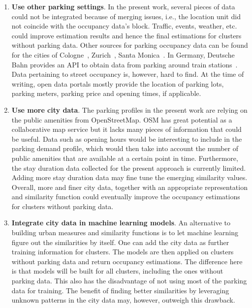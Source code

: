 \begin{enumerate}
	\item \textbf{Use other parking settings}.
In the present work, several pieces of data could not be integrated because of merging issues, i.e., the location unit did not coincide with the occupancy data's block.
Traffic, events, weather, etc. could improve estimation results and hence the final estimations for clusters without parking data.
Other sources for parking occupancy data can be found for the cities of Cologne~\cite{cologne_data}, Zurich~\cite{zurich_data}, Santa Monica~\cite{santa_monica_data}.
In Germany, Deutsche Bahn provides an API to obtain data from parking around train stations~\cite{dbbahn_data}.
Data pertaining to street occupancy is, however, hard to find.
At the time of writing, open data portals mostly provide the location of parking lots, parking meters, parking price and opening times, if applicable.  
	
	\item \textbf{Use more city data}.
The parking profiles in the present work are relying on the public amenities from OpenStreetMap.
OSM has great potential as a collaborative map service but it lacks many pieces of information that could be useful.
Data such as opening hours would be interesting to include in the parking demand profile, which would then take into account the number of public amenities that are available at a certain point in time.
Furthermore, the stay duration data collected for the present approach is currently limited.
Adding more stay duration data may fine tune the emerging similarity values.
Overall, more and finer city data, together with an appropriate representation and similarity function could eventually improve the occupancy estimations for clusters without parking data. 
	
	\item \textbf{Integrate city data in machine learning models}.
An alternative to building urban measures and similarity functions is to let machine learning figure out the similarities by itself.
One can add the city data as further training information for clusters.
The models are then applied on clusters without parking data and return occupancy estimations.
The difference here is that models will be built for all clusters, including the ones without parking data.
This also has the disadvantage of not using most of the parking data for training.
The benefit of finding better similarities by leveraging unknown patterns in the city data may, however, outweigh this drawback. 
	

\end{enumerate}
